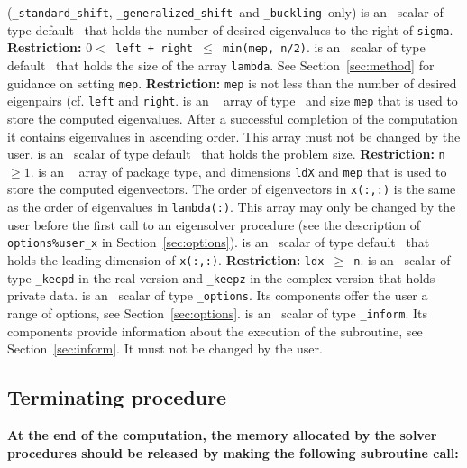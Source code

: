 \begin{description}
%
({\tt \solver\_standard\_shift}, {\tt \solver\_generalized\_shift}\
and {\tt \solver\_buckling}\ only)
is an \intentin\ scalar of type default \Integer\ 
that holds the number of desired eigenvalues to the right of {\tt sigma}.
{\bf Restriction:} {\tt $0 < $ left + right $\le$ min(mep, n/2)}.
%
\itt{mep} is an \intentin\ scalar of type default \Integer\ 
that holds the size of the array {\tt lambda}.
See Section~\ref{sec:method} for guidance on
setting {\tt mep}.
{\bf Restriction:} 
{\tt mep} is not less than the number of desired eigenpairs
(cf. {\tt left} and {\tt right}.
%
\itt{lambda(:)} is an \intentinout\ %
array of type \REALDP\
and size {\tt mep} that is
used to store the computed eigenvalues.
After a successful completion of the computation
it contains eigenvalues in ascending order.
This array must not be changed by the user.
%
\itt{n} is an \intentin\ scalar of type default \Integer\ 
that holds the problem size.
{\bf Restriction:} {\tt n $\ge 1$}.
%
 is an \intentinout\ %
array of package type,
and dimensions {\tt ldX} and {\tt mep} that is
used to store the computed eigenvectors.
The order of eigenvectors in {\tt x(:,:)}
is the same as the order of eigenvalues in {\tt lambda(:)}.
This array may only be changed by the user
before the first call to an eigensolver procedure
(see the description of {\tt options\%user\_x} in Section~\ref{sec:options}).
%
\itt{ldx} is an \intentin\ scalar of type default \Integer\ 
that holds the leading dimension of {\tt x(:,:)}.
{\bf Restriction:} {\tt ldx $\ge$ n}.
%
\itt{keep} is an \intentinout\ scalar of type 
{\tt \solver\_keepd} in the real version and
{\tt \solver\_keepz} in the complex version
that holds private data. 
%
 is an \intentin\  scalar  of type {\tt \solver\_options}.
Its components offer the user a range of options,
see Section~\ref{sec:options}.
%
\itt{inform} is an \intentinout\ scalar of type 
{\tt \solver\_inform}. Its components provide information about the execution
of the subroutine, see Section~\ref{sec:inform}.
It must not be changed by the user.
%
\end{description}

\subsection{Terminating procedure}

{\bf
At the end of the computation, the memory 
allocated by the solver procedures
should be released
by making the following subroutine call:
}


